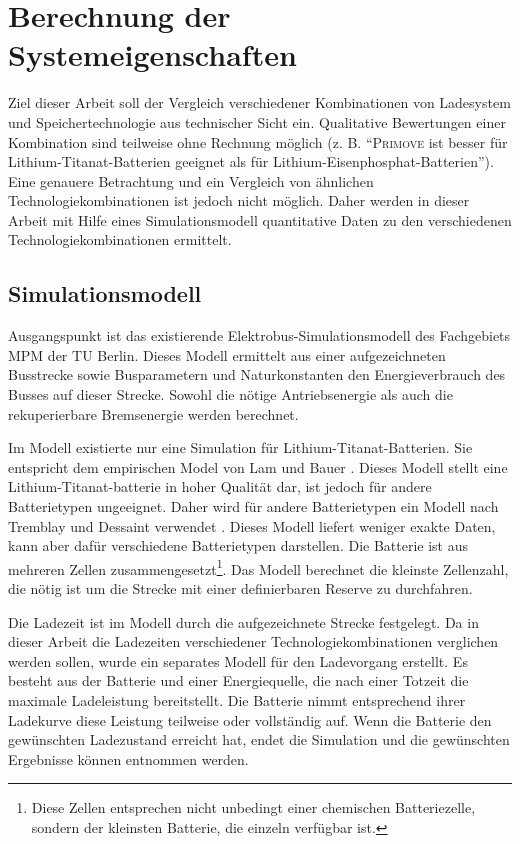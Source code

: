 \chapter{Berechnung der Systemeigenschaften}
\label{chap4}
Ziel dieser Arbeit soll der Vergleich verschiedener Kombinationen von Ladesystem und Speichertechnologie aus technischer Sicht ein. Qualitative Bewertungen einer Kombination sind teilweise ohne Rechnung möglich (z. B. "`\textsc{Primove} ist besser für Lithium-Titanat-Batterien geeignet als für Lithium-Eisenphosphat-Batterien"'). Eine genauere Betrachtung und ein Vergleich von ähnlichen Technologiekombinationen ist jedoch nicht möglich. Daher werden in dieser Arbeit mit Hilfe eines Simulationsmodell quantitative Daten zu den verschiedenen Technologiekombinationen ermittelt.

\section{Simulationsmodell}
 Ausgangspunkt ist das existierende Elektrobus-Simulationsmodell des Fachgebiets MPM der TU Berlin. Dieses Modell ermittelt aus einer aufgezeichneten Busstrecke sowie Busparametern und Naturkonstanten den Energieverbrauch des Busses auf dieser Strecke. Sowohl die nötige Antriebsenergie als auch die rekuperierbare Bremsenergie werden berechnet.

Im Modell existierte nur eine Simulation für Lithium-Titanat-Batterien. Sie entspricht dem empirischen Model von Lam und Bauer \cite{lam2011practical}. Dieses Modell stellt eine Lithium-Titanat-batterie in hoher Qualität dar, ist jedoch für andere Batterietypen ungeeignet. Daher wird für andere Batterietypen ein Modell nach Tremblay und Dessaint verwendet \cite{tremblay2009experimental}. Dieses Modell liefert weniger exakte Daten, kann aber dafür verschiedene Batterietypen darstellen. Die Batterie ist aus mehreren Zellen zusammengesetzt\footnote{Diese Zellen entsprechen nicht unbedingt einer chemischen Batteriezelle, sondern der kleinsten Batterie, die einzeln verfügbar ist.}. Das Modell berechnet die kleinste Zellenzahl, die nötig ist um die Strecke mit einer definierbaren Reserve zu durchfahren.

Die Ladezeit ist im Modell durch die aufgezeichnete Strecke festgelegt. Da in dieser Arbeit die Ladezeiten verschiedener Technologiekombinationen verglichen werden sollen, wurde ein separates Modell für den Ladevorgang erstellt. Es besteht aus der Batterie und einer Energiequelle, die nach einer Totzeit die maximale Ladeleistung bereitstellt. Die Batterie nimmt entsprechend ihrer Ladekurve diese Leistung teilweise oder vollständig auf. Wenn die Batterie den gewünschten Ladezustand erreicht hat, endet die Simulation und die gewünschten Ergebnisse können entnommen werden.

